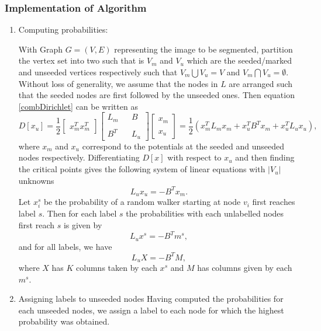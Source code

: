 \documentclass[10pt,a4paper]{article}
\begin{document}
\subsubsection{Implementation of Algorithm}
\begin{enumerate}
	\item Computing probabilities:
	
	With Graph $G=(V,E)$ representing the image to be segmented, partition the vertex set into two such that is $V_m$ and $V_u$ which are the seeded/marked and unseeded vertices respectively such that $V_m \bigcup V_u = V$ and $V_m \bigcap V_u = \emptyset$.
	Without loss of generality, we assume that the nodes in $L$ are arranged such that the seeded nodes are first followed by the unseeded ones. Then equation \ref{combDirichlet} can be written as 
	\begin{equation}
	D[x_u] = \frac{1}{2} \begin{bmatrix}
	x_m ^T x_m ^T
	\end{bmatrix} \begin{bmatrix}
	L_m & & B \\\\
	B^T & & L_u
	\end{bmatrix} \begin{bmatrix}
	x_m \\ \\
	x_u
	\end{bmatrix} = 
	\frac{1}{2}( x_m ^T L_m x_m + x_u ^T B^T x_m + x_u ^T L_u x_u),
	\end{equation}
	where $x_m$ and $x_u$ correspond to the potentials at the seeded and unseeded nodes respectively.
	Differentiating $D[x]$ with respect to $x_u$ and then finding the critical points gives  the following system of linear equations with $|V_u|$ unknowns
	\begin{equation}
	L_u x_u = -B^T x_m.
	\end{equation} 
	Let $x_i ^s $ be the probability of a random walker starting at node $v_i$ first reaches label $s$. Then for each label $s$ the probabilities with each unlabelled nodes first reach $s$ is given by
	\begin{equation}
	L_u x^s = -B^T m^s,
	\end{equation}
	and for all labels, we have 
		\begin{equation}
	L_u X = -B^T M,
	\label{finalprobs}
	\end{equation}
	where $X$ has $K$ columns taken by each $x^s$ and $M$ has columns given by each $m^s$.
	
	\item Assigning labels to unseeded nodes
	Having computed the probabilities for each unseeded nodes, we assign a label to each node for which the highest probability was obtained.
\end{enumerate}
\end{document}
